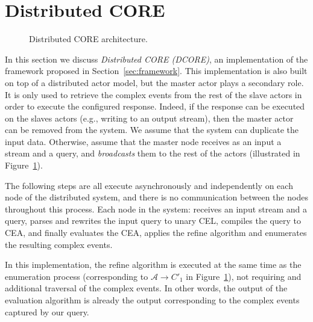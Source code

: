 



\section{Distributed CORE}\label{sec:dcore}

\begin{figure}[H]
  \centering
  \caption{Distributed CORE architecture.}
  \label{fig:dcore}
\end{figure}

In this section we discuss \emph{Distributed CORE (DCORE)}, an implementation of the framework proposed in Section~\ref{sec:framework}. This implementation is also built on top of a distributed actor model, but the master actor plays a secondary role. It is only used to retrieve the complex events from the rest of the slave actors in order to execute the configured response. Indeed, if the response can be executed on the slaves actors (e.g., writing to an output stream), then the master actor can be removed from the system. We assume that the system can duplicate the input data. Otherwise, assume that the master node receives as an input a stream and a query, and \emph{broadcasts} them to the rest of the actors (illustrated in Figure~\ref{fig:dcore}).

The following steps are all execute asynchronously and independently on each node of the distributed system, and there is no communication between the nodes throughout this process. Each node in the system: receives an input stream and a query, parses and rewrites the input query to unary CEL, compiles the query to CEA, and finally evaluates the CEA, applies the refine algorithm and enumerates the resulting complex events.

In this implementation, the refine algorithm is executed at the same time as the enumeration process (corresponding to $\mathcal{A} \to C'_{1}$ in Figure~\ref{fig:dcore}), not requiring and additional traversal of the complex events. In other words, the output of the evaluation algorithm is already the output corresponding to the complex events captured by our query.

